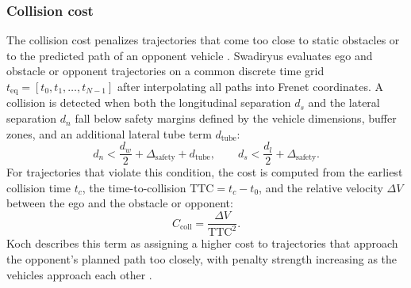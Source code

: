 \subsubsection{Collision cost}
The collision cost penalizes trajectories that come too close to static obstacles or to the predicted path of an opponent vehicle \cite{swadiryus_DifferentiableMotionPlanning_2025, koch_DifferentiableInterpretablePath_2025}.
Swadiryus evaluates ego and obstacle or opponent trajectories on a common discrete time grid $t_{\text{eq}} = [t_0, t_1, \ldots, t_{N-1}]$ after interpolating all paths into Frenet coordinates.
A collision is detected when both the longitudinal separation $d_s$ and the lateral separation $d_n$ fall below safety margins defined by the vehicle dimensions, buffer zones, and an additional lateral tube term $d_{\text{tube}}$:
\begin{equation}
    d_n < \frac{d_w}{2} + \Delta_{\text{safety}} + d_{\text{tube}}, \qquad d_s < \frac{d_l}{2} + \Delta_{\text{safety}}.
\end{equation}
For trajectories that violate this condition, the cost is computed from the earliest collision time $t_c$, the time-to-collision $\text{TTC} = t_c - t_0$, and the relative velocity $\Delta V$ between the ego and the obstacle or opponent:
\begin{equation}
    C_{\text{coll}} = \frac{\Delta V}{\text{TTC}^2}.
\end{equation}
Koch describes this term as assigning a higher cost to trajectories that approach the opponent's planned path too closely, with penalty strength increasing as the vehicles approach each other \cite{koch_DifferentiableInterpretablePath_2025}.


